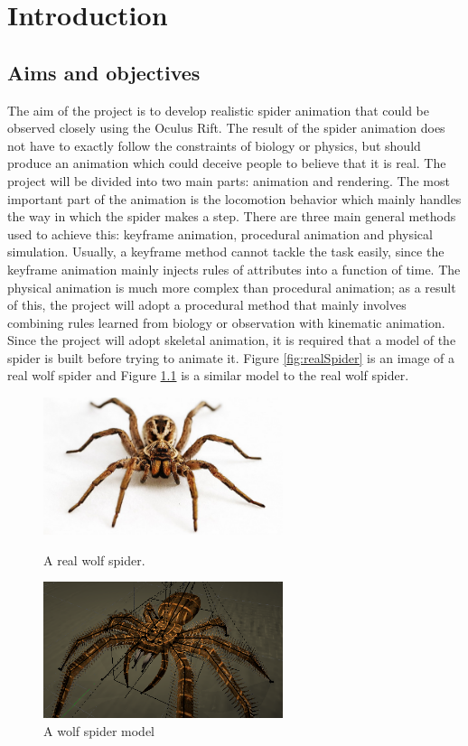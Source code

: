 \chapter{Introduction}
\section{Aims and objectives}
The aim of the project is to develop realistic spider animation that could be observed closely using the Oculus Rift. The result of the spider animation does not have to exactly follow the constraints of biology or physics, but should produce an animation which could deceive people to believe that it is real. 
The project will be divided into two main parts: animation and rendering. 
The most important part of the animation is the locomotion behavior which mainly handles the way in which the spider makes a step. 
There are three main general methods used to achieve this: keyframe animation, procedural animation and physical simulation. Usually, a keyframe method cannot tackle the task easily, since the keyframe animation mainly injects rules of attributes into a function of time. The physical animation is much more complex than procedural animation; as a result of this, the project will adopt a procedural method that mainly involves combining rules learned from biology or observation with kinematic animation.  
Since the project will adopt skeletal animation, it is required that a model of the spider is built before trying to animate it. Figure  \ref{fig:realSpider} is an image of a real wolf spider and Figure \ref{fig:spiderModel} is a similar model to the real wolf spider.
\begin{figure}[ht!]
\centering
\begin{minipage}[b]{0.45\linewidth}
\includegraphics[width=7cm]{figures/realSpider.png}
\caption{A real wolf spider. \protect\cite{realSpider}}
\label{fig:realSpider}
\end{minipage}
\quad
\begin{minipage}[b]{0.45\linewidth}
\includegraphics[width=7cm]{figures/spiderModel.png}
\caption{A wolf spider model \protect\cite{spiderModel}}
\label{fig:spiderModel}
\end{minipage}
\end{figure}
